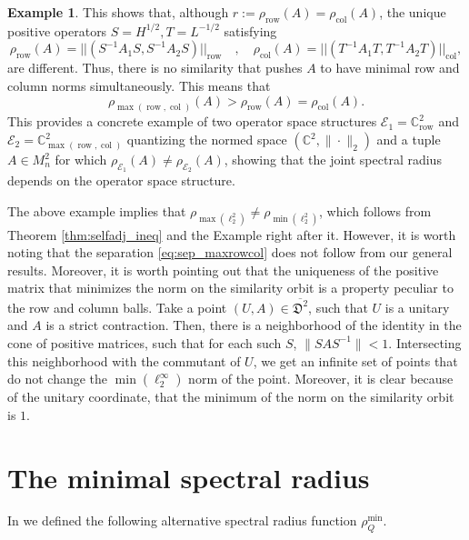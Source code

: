 \documentclass[12pt]{amsart}
\numberwithin{equation}{section}
\theoremstyle{definition}
\newtheorem{example}[theorem]{Example}
\newcommand{\be}{\begin{equation}}
\newcommand{\ee}{\end{equation}}
\newcommand{\cE}{\mathcal{E}}
\newcommand{\bC}{\mathbb{C}}
\newcommand{\fD}{{\mathfrak{D}}}
\begin{document}
\begin{example}
This shows that, although $r := \rho_{\operatorname{row}}(A) = \rho_{\operatorname{col}}(A)$, the unique positive operators $S = H^{1/2} , T = L^{-1/2}$ satisfying 
\[
\rho_{\operatorname{row}}(A) = || (S^{-1}  A_1 S, S^{-1} A_2  S)||_{\operatorname{row}} \quad, \quad \rho_{\operatorname{col}}(A) = || (T^{-1}  A_1 T, T^{-1} A_2  T)||_{\operatorname{col}}, 
\]
are different. 
Thus, there is no similarity that pushes $A$ to have minimal row and column norms simultaneously. This means that 
\be\label{eq:sep_maxrowcol}
\rho_{\max(\operatorname{row},\operatorname{col})}(A) > \rho_{\operatorname{row}}(A) = \rho_{\operatorname{col}}(A).
\ee
This provides a concrete example of two operator space structures $\cE_1 = \bC^2_{\operatorname{row}}$ and $\cE_2 = \bC^2_{\max(\operatorname{row},\operatorname{col})}$ quantizing the normed space $(\bC^2, \|\cdot\|_2)$ and a tuple $A \in M_n^2$ for which $\rho_{\cE_1}(A) \neq \rho_{\cE_2}(A)$, showing that the joint spectral radius depends on the operator space structure. 
\end{example}

The above example implies that $\rho_{\max(\ell^2_2)} \neq \rho_{\min(\ell^2_2)}$, which follows from Theorem \ref{thm:selfadj_ineq} and the Example right after it. 
However, it is worth noting that the separation \eqref{eq:sep_maxrowcol} does not follow from our general results. Moreover, it is worth pointing out that the uniqueness of the positive matrix that minimizes the norm on the similarity orbit is a property peculiar to the row and column balls. Take a point $(U,A) \in \overline{\fD^2}$, such that $U$ is a unitary and $A$ is a strict contraction. Then, there is a neighborhood of the identity in the cone of positive matrices, such that for each such $S$, $\|S A S^{-1}\| < 1$. Intersecting this neighborhood with the commutant of $U$, we get an infinite set of points that do not change the $\min(\ell^{\infty}_2)$ norm of the point. Moreover, it is clear because of the unitary coordinate, that the minimum of the norm on the similarity orbit is $1$.


\section{The minimal spectral radius}

In \cite{shalsham2025spectral} we defined the following alternative spectral radius function $\rho^{\min}_Q$. 
\end{document}
